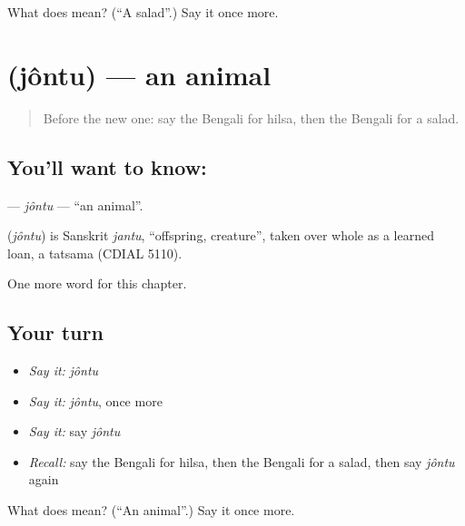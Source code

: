 \begin{tcolorbox}[breakable,colback=teal!4,colframe=teal!35!black,title={Before you move on}]
What does  mean? (\textquotedblleft{}A salad\textquotedblright{}.) Say it once more.
\end{tcolorbox}
\section[\texorpdfstring{\bn{জন্তু} (jôntu)}{জন্তু (jôntu)}]{ (jôntu) — an animal}

\label{lesson:BN-C224-jontu}



\begin{quote}
Before the new one: say the Bengali for hilsa, then the Bengali for a salad.
\end{quote}

\subsection*{You'll want to know: }
\textbf{} — \emph{jôntu} — \textquotedblleft{}an animal\textquotedblright{}.

\begin{cousinweb}
\textbf{} (\emph{jôntu}) is Sanskrit \emph{jantu}, \textquotedblleft{}offspring, creature\textquotedblright{}, taken over whole as a learned loan, a tatsama (CDIAL 5110).
\end{cousinweb}

\begin{grammarlens}[title={What you've built}]
One more word for this chapter.
\end{grammarlens}

\subsection*{Your turn}
\begin{itemize}
\raggedright
  \item \emph{Say it:} \emph{jôntu}
  \item \emph{Say it:} \emph{jôntu}, once more
  \item \emph{Say it:} say \emph{jôntu}
  \item \emph{Recall:} say the Bengali for hilsa, then the Bengali for a salad, then say \emph{jôntu} again
\end{itemize}

\begin{tcolorbox}[breakable,colback=teal!4,colframe=teal!35!black,title={Before you move on}]
What does  mean? (\textquotedblleft{}An animal\textquotedblright{}.) Say it once more.
\end{tcolorbox}
